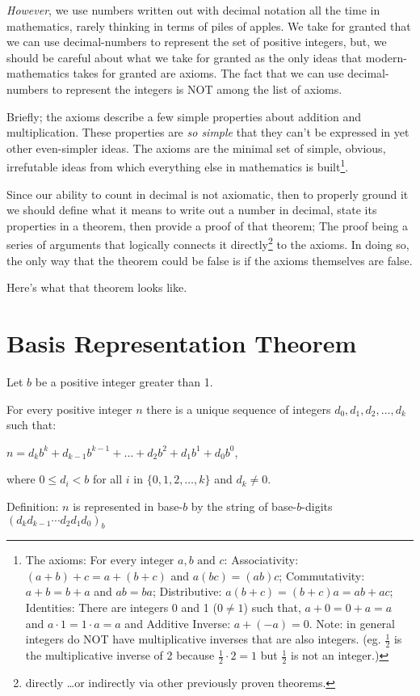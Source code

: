 \documentclass{article}
\newenvironment{jprIn}{\begin{adjustwidth}{2em}{}}{\end{adjustwidth}}
\begin{document}
\emph{However}, we use numbers written out with decimal notation all the time in mathematics,
rarely thinking in terms of piles of apples.
We take for granted
that we can use decimal-numbers to represent the set of positive integers,
but, we should be careful about what we take for granted as the 
only ideas that modern-mathematics
takes for granted are axioms.
The fact that we can use decimal-numbers to represent the integers is NOT among the list of axioms.

Briefly; the axioms describe a few simple properties about addition and multiplication.
These properties are \emph{so simple} that they can't be expressed in
yet other even-simpler ideas. The axioms are the minimal set of simple,
obvious, irrefutable ideas from which
everything else in mathematics is built\footnote{The axioms:
For every integer $a,b\text{ and }c$:
Associativity: $(a+b)+c=a+(b+c)$ and $a(bc)=(ab)c$;
Commutativity: $a+b=b+a$ and $ab=ba$;
Distributive: $a(b+c)=(b+c)a=ab+ac$;
Identities: There are integers 0 and 1 ($0\ne1$) such that,
$a+0=0+a=a$ and $a\cdot{}1=1\cdot{}a=a$ and
Additive Inverse: $a+(-a)=0$.
Note: in general integers do NOT have multiplicative inverses 
that are also integers. (eg. $\frac{1}{2}$ is the multiplicative
inverse of 2 because $\frac{1}{2}\cdot{}2=1$ but $\frac{1}{2}$ is not an integer.)}.

Since our ability to count in decimal is not axiomatic, then to properly ground it we should
define what it means to write out a number in decimal,
state its properties in a theorem,
then provide a proof of that theorem;
The proof being
a series of arguments that logically connects it
directly\footnote{directly \dots{}or indirectly
via other previously proven theorems.} to the axioms. 
In doing so, the only way
that the theorem could be false is if the axioms themselves are false.

Here's what that theorem looks like.
\section*{Basis Representation Theorem}
\begin{jprIn}
Let $b$ be a positive integer greater than 1.

For every positive integer $n$ there is a unique sequence
of integers $d_0, d_1, d_2,\dots{},d_k$ such that:

\hspace{3em}$n=d_kb^k+d_{k-1}b^{k-1}+\dots+d_2b^2+d_1b^1+d_0b^0$,

where $0\le{}d_i<b$ for all $i$ in $\{0,1,2,\dots{},k\}$ and $d_k\ne0$.

Definition: $n$ is represented in base-$b$ by the string
of base-$b$-digits $(d_kd_{k-1}{\cdots}d_2d_1d_0)_b$
\end{jprIn}
\bigskip
\end{document}
